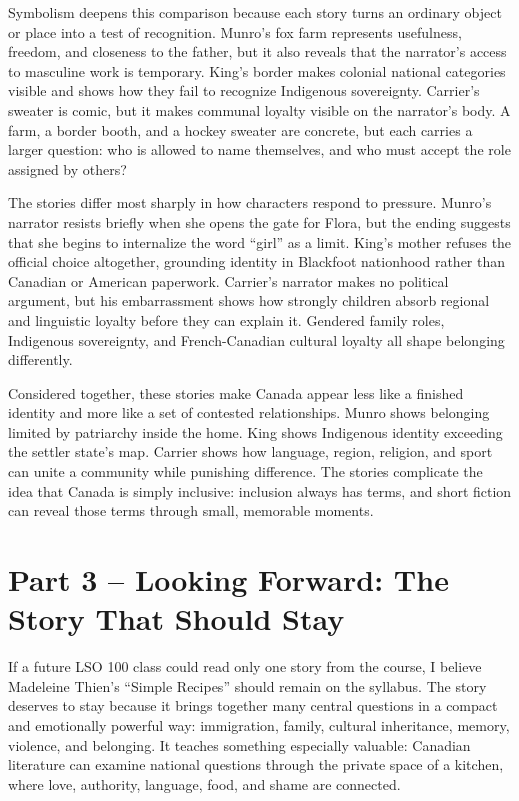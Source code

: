 \documentclass[12pt]{article}
\begin{document}
Symbolism deepens this comparison because each story turns an ordinary object or place into a test of recognition. Munro's fox farm represents usefulness, freedom, and closeness to the father, but it also reveals that the narrator's access to masculine work is temporary. King's border makes colonial national categories visible and shows how they fail to recognize Indigenous sovereignty. Carrier's sweater is comic, but it makes communal loyalty visible on the narrator's body. A farm, a border booth, and a hockey sweater are concrete, but each carries a larger question: who is allowed to name themselves, and who must accept the role assigned by others?

The stories differ most sharply in how characters respond to pressure. Munro's narrator resists briefly when she opens the gate for Flora, but the ending suggests that she begins to internalize the word ``girl'' as a limit. King's mother refuses the official choice altogether, grounding identity in Blackfoot nationhood rather than Canadian or American paperwork. Carrier's narrator makes no political argument, but his embarrassment shows how strongly children absorb regional and linguistic loyalty before they can explain it. Gendered family roles, Indigenous sovereignty, and French-Canadian cultural loyalty all shape belonging differently.

Considered together, these stories make Canada appear less like a finished identity and more like a set of contested relationships. Munro shows belonging limited by patriarchy inside the home. King shows Indigenous identity exceeding the settler state's map. Carrier shows how language, region, religion, and sport can unite a community while punishing difference. The stories complicate the idea that Canada is simply inclusive: inclusion always has terms, and short fiction can reveal those terms through small, memorable moments.

\section*{Part 3 -- Looking Forward: The Story That Should Stay}

If a future LSO 100 class could read only one story from the course, I believe Madeleine Thien's ``Simple Recipes'' should remain on the syllabus. The story deserves to stay because it brings together many central questions in a compact and emotionally powerful way: immigration, family, cultural inheritance, memory, violence, and belonging. It teaches something especially valuable: Canadian literature can examine national questions through the private space of a kitchen, where love, authority, language, food, and shame are connected.
\end{document}
